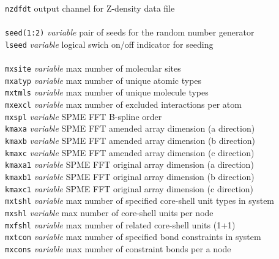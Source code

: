 \begin{tabbing}
\> {\tt nzdfdt}                       \> output channel for Z-density data file \\
\>                   \>                    \> \\
\> {\tt seed(1:2)}   \> {\em variable}     \> pair of seeds for the random number generator \\
\> {\tt lseed}       \> {\em variable}     \> logical swich on/off indicator for seeding \\
\>                   \>                    \> \\
\> {\tt mxsite}      \> {\em variable}     \> max number of molecular sites \\
\> {\tt mxatyp}      \> {\em variable}     \> max number of unique atomic types \\
\> {\tt mxtmls}      \> {\em variable}     \> max number of unique molecule types \\
\> {\tt mxexcl}      \> {\em variable}     \> max number of excluded interactions per atom \\
\> {\tt mxspl}       \> {\em variable}     \> SPME FFT B-spline order \\
\> {\tt kmaxa}       \> {\em variable}     \> SPME FFT amended array dimension (a direction) \\
\> {\tt kmaxb}       \> {\em variable}     \> SPME FFT amended array dimension (b direction) \\
\> {\tt kmaxc}       \> {\em variable}     \> SPME FFT amended array dimension (c direction) \\
\> {\tt kmaxa1}      \> {\em variable}     \> SPME FFT original array dimension (a direction) \\
\> {\tt kmaxb1}      \> {\em variable}     \> SPME FFT original array dimension (b direction) \\
\> {\tt kmaxc1}      \> {\em variable}     \> SPME FFT original array dimension (c direction) \\
\> {\tt mxtshl}      \> {\em variable}     \> max number of specified core-shell unit types in system \\
\> {\tt mxshl}       \> {\em variable}     \> max number of core-shell units per node \\
\> {\tt mxfshl}      \> {\em variable}     \> max number of related core-shell units (1+1) \\
\> {\tt mxtcon}      \> {\em variable}     \> max number of specified bond constraints in system \\
\> {\tt mxcons}      \> {\em variable}     \> max number of constraint bonds per a node \\

\end{tabbing}
